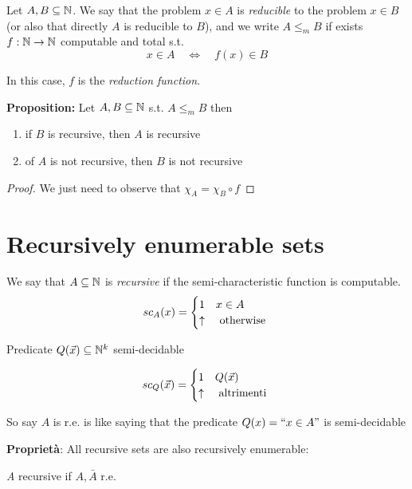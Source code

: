 \newcommand{\red}{\ensuremath{\leq_m}}
\begin{definition}
  Let $A,B \subseteq \mathbb{N}$. We say that the problem $x \in A$ is
  \emph{reducible} to the problem $x \in B$ (or also that directly $A$
  is reducible to $B$), and we write $A \red B$ if exists
  $f : \mathbb{N} \rightarrow \mathbb{N}$ computable and total s.t.
  \[x \in A \quad  \Leftrightarrow \quad f(x) \in B\]
\end{definition}
In this case, $f$ is the \emph{reduction function}.

\textbf{Proposition:} Let $A,B \subseteq \mathbb{N}$ s.t. $A \red B$ then
\begin{enumerate}[label=\arabic*)]
\item if $B$ is recursive, then $A$ is recursive
\item of $A$ is not recursive, then $B$ is not recursive
\end{enumerate}

\begin{proof}
We just need to observe that $\chi_A = \chi_B \circ f$
\end{proof}

\section{Recursively enumerable sets}
We say that $ A \subseteq \mathbb{N} $ is \emph{recursive} if
the semi-characteristic function is computable.
\begin{equation*}
  sc_A(x) = \begin{cases} 1 & x \in A \\ \uparrow & $
    otherwise $
  \end{cases}
\end{equation*}

Predicate $ Q(\vec{x}) \subseteq \mathbb{N}^k $ semi-decidable

\begin{equation*} sc_Q(\vec{x}) = \begin{cases} 1 & Q(\vec{x}) \\
    \uparrow & $ altrimenti $
  \end{cases}
\end{equation*}

So say $A$ is r.e. is like saying that the predicate $ Q(x)=``x \in A"
$ is semi-decidable

\textbf{Proprietà}: All recursive sets are also recursively
enumerable:

\textit{A} recursive if $ A, \bar{A} $ r.e.

